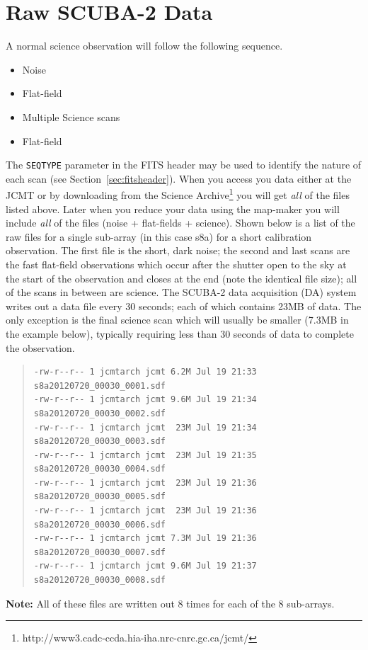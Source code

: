 \documentclass[twoside,11pt]{article}
\newcommand{\xlabel}[1]{}
\renewcommand{\_}{\texttt{\symbol{95}}}
\newenvironment{myquote}{\begin{quote}\begin{small}}{\end{small}\end{quote}}
\newcommand{\param}[1]{\texttt{#1}}
\begin{document}
\clearpage

\section{\xlabel{data_files}Raw SCUBA-2 Data}
\label{sec:raw}
A normal science observation will follow the following sequence.
\vspace{-2mm}
\begin{itemize}\itemsep-0.5em
\item Noise
\item Flat-field
\item Multiple Science scans
\item Flat-field
\end{itemize}
\vspace{-2mm}
The \param{SEQ\_TYPE} parameter in the FITS header may be used to
identify the nature of each scan (see Section~\ref{sec:fitsheader}).
When you access you data either at
the JCMT or by downloading from the Science
Archive\footnote{http://www3.cadc-ccda.hia-iha.nrc-cnrc.gc.ca/jcmt/}
you will get \emph{all} of the files listed above. Later when you
reduce your data using the map-maker you will include \emph{all} of
the files (noise + flat-fields + science).
Shown below is a list of the raw files for a single sub-array (in this
case s8a) for a short calibration observation. The first file is the
short, dark noise; the second and last scans are the fast flat-field
observations which occur after the shutter open to the sky at the
start of the observation and closes at the end (note the identical
file size); all of the scans in between are science. The SCUBA-2 data
acquisition (DA) system writes out a data file every 30 seconds; each
of which contains 23MB of data. The only exception is the final science
scan which will usually be smaller (7.3MB in the example below), typically
requiring less than 30 seconds of data to complete the observation.
\begin{myquote}
\begin{verbatim}
-rw-r--r-- 1 jcmtarch jcmt 6.2M Jul 19 21:33 s8a20120720_00030_0001.sdf
-rw-r--r-- 1 jcmtarch jcmt 9.6M Jul 19 21:34 s8a20120720_00030_0002.sdf
-rw-r--r-- 1 jcmtarch jcmt  23M Jul 19 21:34 s8a20120720_00030_0003.sdf
-rw-r--r-- 1 jcmtarch jcmt  23M Jul 19 21:35 s8a20120720_00030_0004.sdf
-rw-r--r-- 1 jcmtarch jcmt  23M Jul 19 21:36 s8a20120720_00030_0005.sdf
-rw-r--r-- 1 jcmtarch jcmt  23M Jul 19 21:36 s8a20120720_00030_0006.sdf
-rw-r--r-- 1 jcmtarch jcmt 7.3M Jul 19 21:36 s8a20120720_00030_0007.sdf
-rw-r--r-- 1 jcmtarch jcmt 9.6M Jul 19 21:37 s8a20120720_00030_0008.sdf
\end{verbatim}
\end{myquote}
\textbf{Note:} All of these files are written out 8 times for each of the
8 sub-arrays.
\end{document}
